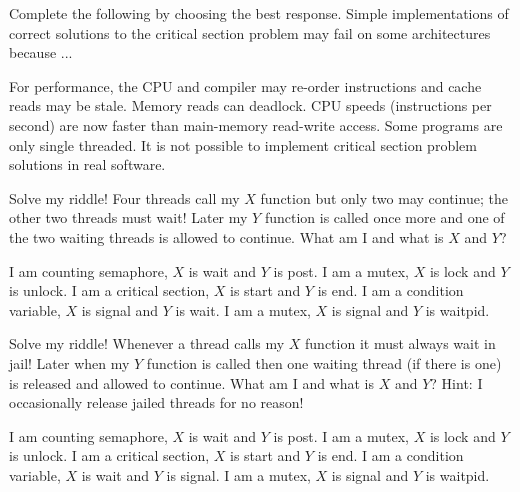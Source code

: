 \variant
Complete the following by choosing the best response. Simple implementations of correct solutions to the critical section problem may fail on some architectures because ...
\begin{answers}
\correctanswer For performance, the CPU and compiler may re-order instructions and cache reads may be stale.
\answer Memory reads can deadlock.
\answer CPU speeds (instructions per second) are now faster than main-memory read-write access.
\answer Some programs are only single threaded.
\answer It is not possible to implement critical section problem solutions in real software.
\end{answers}
\begin{solution}
\end{solution}



\variant
Solve my riddle! Four threads call my $X$ function but only two may continue; the other two threads must wait! Later my $Y$ function is called once more and one of the two waiting threads is allowed to continue. What am I and what is $X$ and $Y$?
\begin{answers}
\correctanswer I am counting semaphore, $X$ is wait and $Y$ is post.
\answer I am a mutex, $X$ is lock and $Y$ is unlock. 
\answer I am a critical section, $X$ is start and $Y$ is end. 
\answer I am a condition variable, $X$ is signal and $Y$ is wait. 
\answer I am a mutex, $X$ is signal and $Y$ is waitpid. 
\end{answers}
\begin{solution}
\end{solution}


\variant
Solve my riddle! Whenever a thread calls my $X$ function it must always wait in jail! Later when my $Y$ function is called then one waiting thread (if there is one) is released and allowed to continue. What am I and what is $X$ and $Y$? Hint: I occasionally release jailed threads for no reason!
\begin{answers}
\answer I am counting semaphore, $X$ is wait and $Y$ is post.
\answer I am a mutex, $X$ is lock and $Y$ is unlock. 
\answer I am a critical section, $X$ is start and $Y$ is end. 
\correctanswer I am a condition variable, $X$ is wait and $Y$ is signal. 
\answer I am a mutex, $X$ is signal and $Y$ is waitpid. 
\end{answers}
\begin{solution}
\end{solution}


